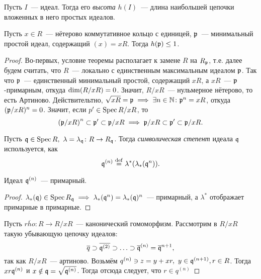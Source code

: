 	\begin{definition} 
		Пусть $I$~--- идеал. Тогда  его \emph{высота} $h(I)$~--- длина наибольшей цепочки вложенных в него простых идеалов. 
	\end{definition}

	\begin{theorem}
	 	Пусть $x \in R$~--- нётерово коммутативное кольцо с единицей, $\fp$~--- минимальный простой идеал, содержащий $(x) = xR$. Тогда $h(\fp) \le 1$. 	 
	 \end{theorem}  
	 \begin{proof}
	 	Во-первых, условие теоремы располагает к замене $R$ на $R_{\fp}$, т.е. далее будем считать, что $R$~--- локально с единственным максимальным идеалом $\fp$. Так что $\fp$~--- единственный минимальный простой, содержащий $xR$, а $xR$~--- $\fp$-примарным, откуда $\dim\lr*{R/xR} = 0$. Значит, $R/xR$~--- нульмерное нётерово, то есть Артиново. Действительтно, $\sqrt{xR} = \fp \implies \exists n \in \N \colon \fp^n = xR$, откуда $(\fp/xR)^n = 0$. Значит, если $p' \in \Spec{R/xR}$, то 
	 	\[
	 		\lr*{\fp/xR}^n \subset \fp' \subset \fp/xR \implies \fp/xR \subset \fp' \subset \fp/xR.
	 	\]

	 	\begin{definition} 
	 		Пусть $\fq \in \Spec{R}, \ \lambda = \lambda_{\fq}\colon R \to R_{\fq}$. Тогда \emph{символическая степент} идеала $\fq$ используется, как 
	 		\[
	 			\fq^{(n)} \eqdef \lambda^*\lr*{\lambda_*(\fq^n)}.
	 		\]
	 	\end{definition}

	 	\begin{lemma} 
	 		Идеал $\fq^{(n)}$~--- примарный. 
	 	\end{lemma}

	 	\begin{proof}
	 		$\lambda_{*}(\fq) \in \Spec{R_{\fq}} \implies \lambda_{*}(\fq^n) = \lambda_{*}(\fq)^n$~--- примарный, а $\lambda^*$ отображает примарные в примарные.  
	 	\end{proof}

	 	Пусть $\overline{rho}\colon R \to R/xR$~--- канонический гомоморфизм. Рассмотрим в $R/xR$ такую убывающую цепочку идеалов: 
	 	\[
	 		\overline{q} \supset \overline{\fq^{(2)}} \supset \ldots \supset \overline{\fq}^{(n)} = \overline{\fq}^{n + 1},
	 	\]
	 	так как $R/xR$~--- артиново. Возьмём $q^{(n)} \ni z = y + xr, \ y \in \fq^{(n + 1)}, r \in R$. Тогда $xr \fq^{(n)}$ и $x \notin \fq = \sqrt{\fq^{(n)}}$. Тогда отсюда следует, что $r \in q^{(n)}$



\end{proof}
